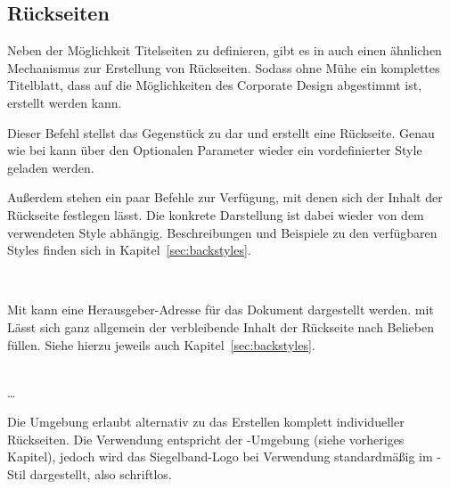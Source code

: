 \subsection{Rückseiten}\label{subsec:backpages}

Neben der Möglichkeit Titelseiten zu definieren, gibt es in \tubslatex auch
einen ähnlichen Mechanismus zur Erstellung von Rückseiten.
Sodass ohne Mühe ein komplettes Titelblatt, dass auf die Möglichkeiten des
Corporate Design abgestimmt ist, erstellt werden kann.

\begin{Declaration}
\end{Declaration}

Dieser Befehl stellst das Gegenstück zu  dar und erstellt eine
Rückseite. Genau wie bei  kann über den Optionalen Parameter
 wieder ein vordefinierter Style geladen werden.

Außerdem stehen ein paar Befehle zur Verfügung, mit denen sich der Inhalt
der Rückseite festlegen lässt. Die konkrete Darstellung ist dabei wieder
von dem verwendeten Style abhängig.
Beschreibungen und Beispiele zu den verfügbaren Styles finden sich in
Kapitel~\ref{sec:backstyles}.


\begin{Declaration}
  \\
\end{Declaration}

Mit  kann eine Herausgeber-Adresse für das Dokument
dargestellt werden.
mit  Lässt sich ganz allgemein der verbleibende
Inhalt der Rückseite nach Belieben füllen.
Siehe hierzu jeweils auch Kapitel~\ref{sec:backstyles}.

\begin{Declaration}
  \\
  \quad\dots\\
\end{Declaration}

Die Umgebung  erlaubt alternativ zu
 das Erstellen komplett individueller
Rückseiten. Die Verwendung entspricht der -Umgebung
(siehe vorheriges Kapitel),
jedoch wird das Siegelband-Logo bei Verwendung standardmäßig im
-Stil dargestellt, also schriftlos.

